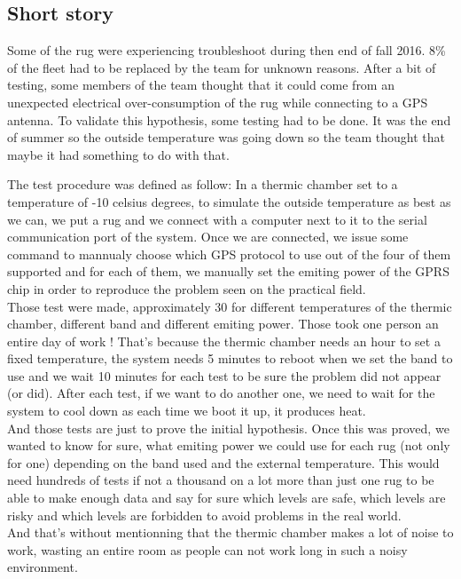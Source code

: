\documentclass[12pt]{article}
\begin{document}
\subsection{Short story}

Some of the \gls{rug} were experiencing troubleshoot during then end of fall 2016. 8\% of the fleet had to be replaced by the team for unknown reasons. After a bit of testing, some members of the team thought that it could come from an unexpected electrical over-consumption of the \gls{rug} while connecting to a GPS antenna. To validate this hypothesis, some testing had to be done. It was the end of summer so the outside temperature was going down so the team thought that maybe it had something to do with that.

The test procedure was defined as follow:
In a thermic chamber set to a temperature of -10 celsius degrees, to simulate the outside temperature as best as we can, we put a \gls{rug} and we connect with a computer next to it to the serial communication port of the system. Once we are connected, we issue some command to mannualy choose which GPS protocol to use out of the four of them supported and for each of them, we manually set the emiting power of the GPRS chip in order to reproduce the problem seen on the practical field.\\

Those test were made, approximately 30 for different temperatures of the thermic chamber, different band and different emiting power. Those took one person an entire day of work ! That's because the thermic chamber needs an hour to set a fixed temperature, the system needs 5 minutes to reboot when we set the band to use and we wait 10 minutes for each test to be sure the problem did not appear (or did). After each test, if we want to do another one, we need to wait for the system to cool down as each time we boot it up, it produces heat.\\

And those tests are just to prove the initial hypothesis. Once this was proved, we wanted to know for sure, what emiting power we could use for each \gls{rug} (not only for one) depending on the band used and the external temperature. This would need hundreds of tests if not a thousand on a lot more than just one \gls{rug} to be able to make enough data and say for sure which levels are safe, which levels are risky and which levels are forbidden to avoid problems in the real world.\\

And that's without mentionning that the thermic chamber makes a lot of noise to work, wasting an entire room as people can not work long in such a noisy environment.\\
\end{document}

